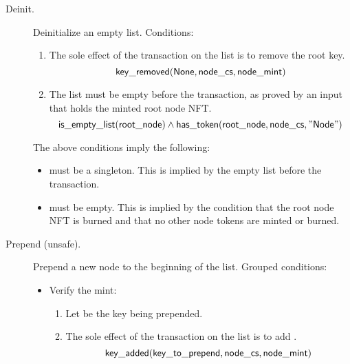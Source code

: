 \documentclass[../midgard.tex]{subfiles}
\begin{document}
\begin{description}
        \initSpendingValidatorWarning
    \item[Deinit.] Deinitialize an empty list. Conditions:
        \begin{enumerate}
            \item The sole effect of the transaction on the list is to remove the root key.
                \begin{equation*}
                    \mathsf{key\_removed}(\mathsf{None}, \mathsf{node\_cs}, \mathsf{node\_mint})
                \end{equation*}
            
            \item The list must be empty before the transaction, as proved by an input  that holds the minted root node NFT.
                \begin{equation*}
                    \mathsf{is\_empty\_list}(\mathsf{root\_node}) \land
                    \mathsf{has\_token}(\mathsf{root\_node}, \mathsf{node\_cs}, \mathsf{"Node"})
                \end{equation*}
        \end{enumerate}
        The above conditions imply the following:
        \begin{itemize}
            \item {} must be a singleton. This is implied by the empty list before the transaction.
            \item {} must be empty. This is implied by the condition that the root node NFT is burned and that no other node tokens are minted or burned. 
        \end{itemize}

    \item[Prepend (unsafe).] Prepend a new node to the beginning of the list. Grouped conditions:
        \begin{itemize}
            \item Verify the mint: 
            \begin{enumerate}
                \item Let  be the key being prepended.
                \item The sole effect of the transaction on the list is to add .
                    \begin{equation*}
                        \mathsf{key\_added}(\mathsf{key\_to\_prepend}, \mathsf{node\_cs}, \mathsf{node\_mint})
                    \end{equation*}
            \end{enumerate}
            

\end{itemize}
\end{description}
\end{document}
